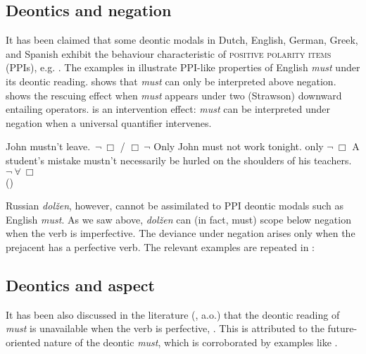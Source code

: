 \documentclass[output=paper,
modfonts,
newtxmath,colorlinks,citecolor=brown
]{langscibook}
\begin{document}
\subsection{Deontics and negation}\label{subsect:deonneg}
It has been claimed that some deontic modals in Dutch, English, German, Greek, and Spanish exhibit the behaviour characteristic of \textsc{positive polarity items} (PPIs), e.g. \cite{hom11,iatzei10,iatzei13}. The examples in  illustrate  PPI-like properties of English \textit{must} under its deontic reading.  shows that \textit{must} can only be interpreted above negation.  shows the rescuing effect when \textit{must} appears under two (Strawson) downward entailing operators.  is an intervention effect: \textit{must} can be interpreted under negation when a universal quantifier intervenes.

\ea \label{modalppis} \ea John mustn't leave. \hfill {} $\,\neg\  \Box$ /  $\Box\ \neg$ \label{modalppisa}
        \ex Only John must not work tonight. \hfill only $\neg\ \Box$ \label{modalppisb}
        \ex A student's mistake mustn't necessarily be hurled on the shoulders of his teachers. \hfill $\neg\ \forall\ \Box$ \label{modalppisc}\\
        \hfill (\citealt[543, 539]{iatzei13})
        \z \z 
       
\noindent Russian \textit{dolžen}, however, cannot be assimilated to PPI deontic modals such as English \textit{must}. As we saw above, \textit{dolžen} can (in fact, must) scope below negation when the verb is imperfective. The deviance under negation arises only when the prejacent has a perfective verb. The relevant examples are repeated in :

\ea \label{rusmust}      
			\z \z
        
\subsection{Deontics and aspect}\label{subsect:deonaspect}
It has been also discussed in the literature (\citealt{han99,nin05,hel16}, a.o.) that the deontic reading of \textit{must} is unavailable when the verb is perfective, . This is attributed to the future-oriented nature of the deontic \textit{must}, which is corroborated by examples like .
\end{document}
